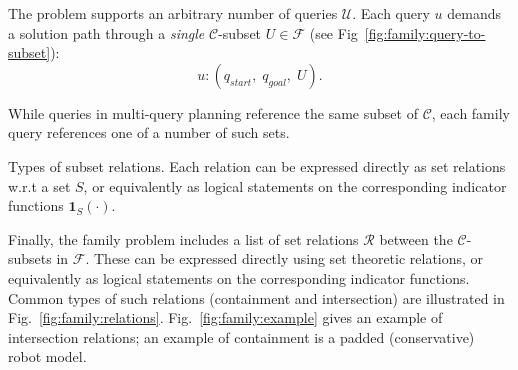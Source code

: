 The problem supports an arbitrary number of queries $\mathcal{U}$.
Each query $u$ demands a solution path through a \emph{single}
$\mathcal{C}$-subset $U \in \mathcal{F}$
(see Fig~\ref{fig:family:query-to-subset}):
\begin{equation}
  u : ( q_{start},\; q_{goal},\; U ) .
  \label{eqn:family:q}
\end{equation}

\begin{marginfigure}
   \centering
   \vspace{-0.05in}
   \vspace{0.1in}
   \caption{While queries in multi-query planning reference
     the same subset of $\mathcal{C}$,
     each family query references one of a number of such sets.}
   \label{fig:family:query-to-subset}
\end{marginfigure}

\begin{marginfigure}
   \centering
   \vspace{-0.05in}
   \vspace{0.1in}
   \caption{Types of subset relations.
     Each relation can be expressed directly as set relations
     w.r.t a set $S$,
     or equivalently as logical statements
     on the corresponding indicator functions
     $\mathbf{1}_S(\cdot)$.}
   \label{fig:family:relations}
\end{marginfigure}

Finally, the family problem includes a list of set relations
$\mathcal{R}$
between the $\mathcal{C}$-subsets in $\mathcal{F}$.
These can be expressed directly using set theoretic relations,
or equivalently as logical statements
on the corresponding indicator functions.
Common types of such relations
(containment and intersection)
are illustrated in Fig.~\ref{fig:family:relations}.
Fig.~\ref{fig:family:example} gives an example of intersection relations;
an example of containment is a padded (conservative) robot model.


